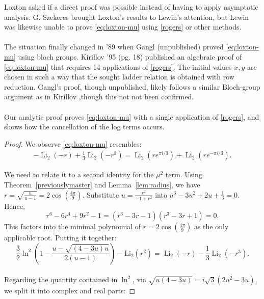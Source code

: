 \documentclass[12pt]{article}
\begin{document}
{\noindent Loxton asked if a direct proof was possible instead of having to apply asymptotic analysis. G. Szekeres brought Loxton's results to Lewin's attention, but Lewin \cite{Lewin1982} was likewise unable to prove \eqref{eq:loxton-mu} using \eqref{rogers} or other methods.
\\
\\
The situation finally changed in '89 when Gangl (unpublished) proved \eqref{eq:loxton-mu} using bloch groups. Kirillov \cite{Kirillov1995} '95 (pg. 18) published an algebraic proof of \eqref{eq:loxton-mu} that requires 14 applications of \eqref{rogers}. The initial values $x,y$ are chosen in such a way that the sought ladder relation is obtained with row reduction. Gangl's proof, though unpublished, likely follows a similar Bloch-group argument as in  Kirillov ,though this not not been confirmed.  
\\
\\
Our analytic proof proves \eqref{eq:loxton-mu} with a single application of \eqref{rogers}, and shows how the cancellation of the log terms occurs.

\begin{proof}
We observe \eqref{eq:loxton-mu} resembles:
\begin{equation}
 \begin{aligned}
 - \operatorname{Li}_2(-r) + \frac{1}{3} \operatorname{Li}_2(-r^3) = \operatorname{Li}_2\left(r e^{\pi i / 3}\right)+\operatorname{Li}_2\left(r e^{-\pi i / 3}\right).
\end{aligned}
\label{eq:loxton-resemblance}
\end{equation}

\noindent We need to relate it to a second identity for the $\mu^2$ term. Using Theorem~\ref{previouslymaster} and Lemma~\ref{lem:radius}, we have $r=\sqrt{\frac{u}{u - 1}} = 2\cos\left(\frac{4\pi}{9}\right)$. Substitute $u=\frac{r^2}{-1+r^2}$ into $u^3 - 3u^2 + 2u + \frac{1}{3}=0$. Hence,
\begin{equation}
r^6 - 6 r^4 + 9 r^2 - 1 = (r^3 - 3 r - 1)(r^3 - 3 r + 1) = 0.
\label{eq:min-poly}
\end{equation}
This factors into the minimal polynomial of $r=2\cos\left(\frac{4\pi}{9}\right)$ as the only applicable root. Putting it together:
\\
\begin{equation*}
 \frac{3}{2} \ln^2 \left( 1 - \frac{u - \sqrt{(4 - 3 u) u}}{2 (u-1)} \right) 
 - \operatorname{Li_2} (r^2) = \operatorname{Li}_2 (-r) - \frac{1}{3} \operatorname{Li}_2 (-r^3). 
\end{equation*}
\\
Regarding the quantity contained in $\ln^2$, via  $\sqrt{u (4-3u)} = i\sqrt{3} (2 u^2 - 3 u)$, we split it into complex and real parts:


\end{proof}}
\end{document}
